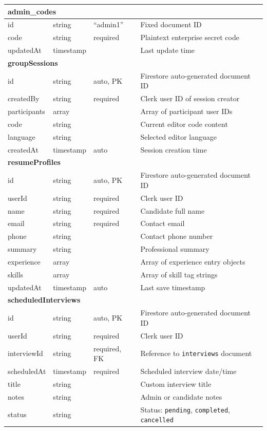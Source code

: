 \documentclass{fisatinternship}
\begin{document}
\begin{longtable}{|p{3.2cm}|p{2cm}|p{2cm}|p{4cm}|}
\multicolumn{4}{|l|}{\textbf{admin\_codes}} \\
\hline
id & string & ``admin1'' & Fixed document ID \\
\hline
code & string & required & Plaintext enterprise secret code \\
\hline
updatedAt & timestamp & & Last update time \\
\hline

\multicolumn{4}{|l|}{\textbf{groupSessions}} \\
\hline
id & string & auto, PK & Firestore auto-generated document ID \\
\hline
createdBy & string & required & Clerk user ID of session creator \\
\hline
participants & array & & Array of participant user IDs \\
\hline
code & string & & Current editor code content \\
\hline
language & string & & Selected editor language \\
\hline
createdAt & timestamp & auto & Session creation time \\
\hline

\multicolumn{4}{|l|}{\textbf{resumeProfiles}} \\
\hline
id & string & auto, PK & Firestore auto-generated document ID \\
\hline
userId & string & required & Clerk user ID \\
\hline
name & string & required & Candidate full name \\
\hline
email & string & required & Contact email \\
\hline
phone & string & & Contact phone number \\
\hline
summary & string & & Professional summary \\
\hline
experience & array & & Array of experience entry objects \\
\hline
skills & array & & Array of skill tag strings \\
\hline
updatedAt & timestamp & auto & Last save timestamp \\
\hline

\multicolumn{4}{|l|}{\textbf{scheduledInterviews}} \\
\hline
id & string & auto, PK & Firestore auto-generated document ID \\
\hline
userId & string & required & Clerk user ID \\
\hline
interviewId & string & required, FK & Reference to \texttt{interviews} document \\
\hline
scheduledAt & timestamp & required & Scheduled interview date/time \\
\hline
title & string & & Custom interview title \\
\hline
notes & string & & Admin or candidate notes \\
\hline
status & string & & Status: \texttt{pending}, \texttt{completed}, \texttt{cancelled} \\
\hline


\end{longtable}
\end{document}
